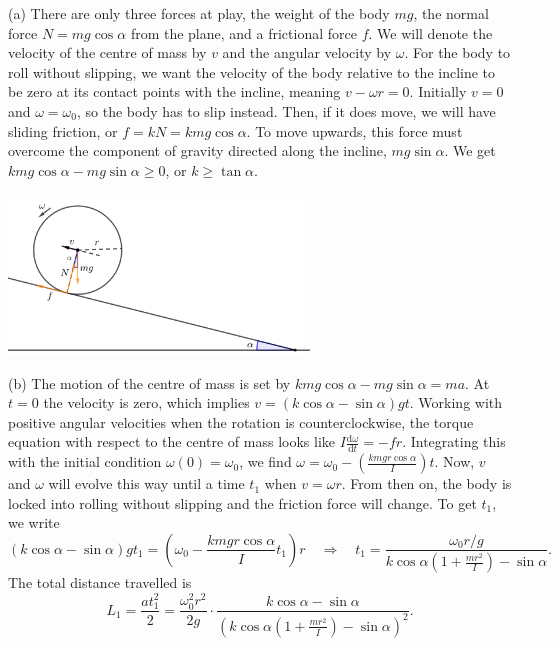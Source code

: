 \documentclass[../TST.tex]{subfiles}
\begin{document}
\ifprob \else
\begin{solution} 
	(a) There are only three forces at play, the weight of the body $mg$, the normal force $N=mg\cos{\alpha}$ from the plane, and a frictional force $f$. We will denote the velocity of the centre of mass by $v$ and the angular velocity by $\omega$. For the body to roll without slipping, we want the velocity of the body relative to the incline  to be zero at its contact points with the incline, meaning $v-\omega r=0$. Initially $v=0$ and $\omega=\omega_0$, so the body has to slip instead. Then, if it does move, we will have sliding friction, or $f=kN=kmg\cos{\alpha}$. To move upwards, this force must overcome the component of gravity directed along the incline, $mg\sin{\alpha}$. We get $kmg\cos{\alpha}-mg\sin{\alpha}\geq 0$, or $\boxed{k\geq \tan{\alpha}.}$
\begin{center}
\includegraphics[width=0.6\textwidth]{fig/a2010_l1.pdf}
\end{center}
(b) The motion of the centre of mass is set by $kmg\cos{\alpha}-mg\sin{\alpha}=ma$. At $t=0$ the velocity is zero, which implies $v=(k\cos{\alpha}-\sin{\alpha})gt$. Working with positive angular velocities when the rotation is counterclockwise, the torque equation with respect to the centre of mass looks like $I \frac{\mathrm{d}\omega}{\mathrm{d}t}=-fr$. Integrating this with the initial condition $\omega(0)=\omega_0$, we find $\omega =\omega_0- \left(\frac{kmgr\cos{\alpha}}{I}\right) t$. Now, $v$ and $\omega$ will evolve this way until a time $t_1$ when $v=\omega r$. From then on, the body is locked into rolling without slipping and the friction force will change. To get $t_1$, we write
\begin{equation*}
	(k\cos{\alpha}-\sin{\alpha})gt_1=\left(\omega_0- \frac{kmgr\cos{\alpha}}{I}t_1\right)r \quad\Rightarrow\quad t_1=\frac{\omega_0r/g}{k\cos{\alpha}\left(1+\frac{mr^2}{I}\right)-\sin{\alpha}}
.
\end{equation*}
The total distance travelled is 
\begin{equation*}
L_1=\frac{at_1^2}{2}=\boxed{\frac{\omega_0^2r^2}{2g}\cdot \frac{k\cos{\alpha}-\sin{\alpha}}{\left(k\cos{\alpha}\left(1+\frac{mr^2}{I}\right)-\sin{\alpha}\right)^2}.}

\end{equation*}
\end{solution}
\end{document}
